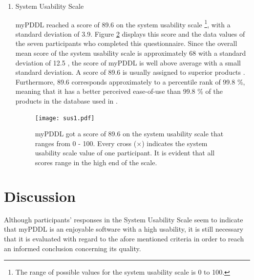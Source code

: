 \documentclass[a4paper,12pt]{report}
\newcommand{\mypddl}{\smallerft[0.8]{myPDDL}\xspace}
\newcommand\smallerft[2][0.85]{{\scalefont{#1}#2}}
\begin{document}
\begin{enumerate}
\begin{figure}[h]
  \centering
  \hspace{0.5cm}
  \texttt{[image: ttot1.pdf]}
  \caption{Geometric mean of the total time on task without Question 4.}
  \label{fig:task-completions-agg-without-q4}
\end{figure}

Diagram \ref{fig:task-completions-agg-without-q4} illustrates the
effect that the tool availability had on the total time participants
spent on a task, without question 4. It only takes 52\% of the time
without tools to answer questions 1, 2, 3 and 5 once tools can be
used.
\item System Usability Scale
\label{sec-5-2-4-3}

\mypddl reached a score of 89.6 on the system usability scale \footnote{The range of possible values for the system usability scale is
0 to 100.},
with a standard deviation of 3.9. Figure \ref{fig:sus} displays this
score and the data values of the seven participants who completed this
questionnaire. Since the overall mean score of the system usability
scale is approximately 68 with a standard deviation of 12.5
\cite{sauro2011practical}, the score of \mypddl is well above average
with a small standard deviation. A score of 89.6 is usually assigned
to superior products \cite{bangor2008empirical}. Furthermore, 89.6
corresponds approximately to a percentile rank of 99.8 \%, meaning that
it has a better perceived ease-of-use than 99.8 \% of the products in
the database used in \textcite{sauro2011practical}.

\begin{figure}[]
  \centering
  \hspace{0.5cm}
  \texttt{[image: sus1.pdf]}
  \caption{\mypddl got a score of 89.6 on the system usability scale
    that ranges from 0 - 100. Every cross ($\times$) indicates the
    system usability scale value of one participant. It is evident
    that all scores range in the high end of the scale.}
  \label{fig:sus}
\end{figure}
\end{enumerate}

\section{Discussion}
\label{sec-5-3}

Although participants’ responses in the System Usability Scale seem to
indicate that myPDDL is an enjoyable software with a high usability,
it is still necessary that it is evaluated with regard to the afore
mentioned criteria in order to reach an informed conclusion concerning
its quality.
\end{document}
